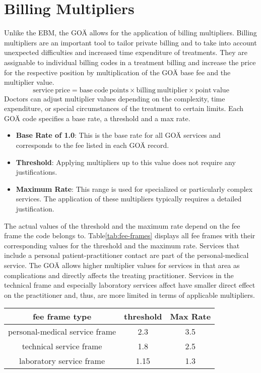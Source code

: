 \section{Billing Multipliers}\label{sec:billing-multipliers}
Unlike the EBM, the GOÄ allows for the application of billing multipliers.
Billing multipliers are an important tool to tailor private billing and to take into account unexpected difficulties and increased time expenditure of treatments\cite{walter2008abrechnung}.
They are assignable to individual billing codes in a treatment billing and increase the price for the respective position by multiplication of the GOÄ base fee and the multiplier value.
\[
    \mathrm{service\ price} = \mathrm{base\ code\ points} \times \mathrm{billing\ multiplier} \times \mathrm{point\ value}
\]
Doctors can adjust multiplier values depending on the complexity, time expenditure, or special circumstances of the treatment to certain limits.
Each GOÄ code specifies a base rate, a threshold and a max rate\cite{bruck1998kommentar}.
\begin{itemize}
    \item \textbf{Base Rate of 1.0}: This is the base rate for all GOÄ services and corresponds to the fee listed in each GOÄ record.
    \item \textbf{Threshold}: Applying multipliers up to this value does not require any justifications.
    \item \textbf{Maximum Rate}: This range is used for specialized or particularly complex services.
    The application of these multipliers typically requires a detailed justification.
\end{itemize}

The actual values of the threshold and the maximum rate depend on the fee frame the code belongs to.
Table\ref{tab:fee-frames} displays all fee frames with their corresponding values for the threshold and the maximum rate\cite{hermanns2013bemessung}.
Services that include a personal patient-practitioner contact are part of the personal-medical service.
The GOÄ allows higher multiplier values for services in that area as complications and directly affects the treating practitioner.
Services in the technical frame and especially laboratory services affect have smaller direct effect on the practitioner and, thus, are more limited in terms of applicable multipliers.
\begin{center}
    \begin{tabular}{ |c|c|c| }\label{tab:fee-frames}
        \hline
        fee frame type & threshold & Max Rate \\
        \hline
        personal-medical service frame & 2.3 & 3.5 \\
        technical service frame & 1.8 & 2.5 \\
        laboratory service frame & 1.15 & 1.3 \\
        \hline
    \end{tabular}
\end{center}

